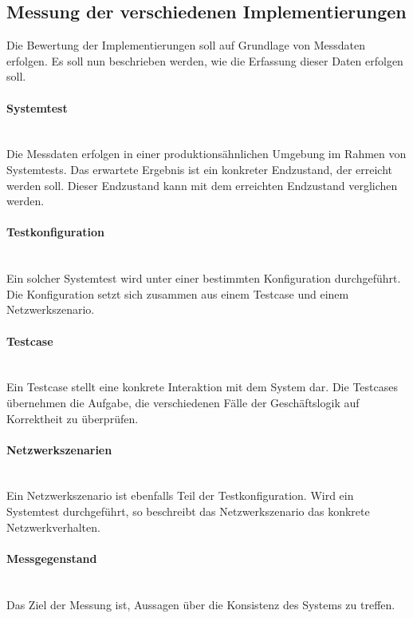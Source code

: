 \subsection{Messung der verschiedenen Implementierungen}

Die Bewertung der Implementierungen soll auf Grundlage von Messdaten erfolgen. Es soll nun beschrieben werden, wie die Erfassung dieser Daten erfolgen soll.


\paragraph*{Systemtest} \mbox{}\\
Die Messdaten erfolgen in einer produktionsähnlichen Umgebung im Rahmen von Systemtests. Das erwartete Ergebnis ist ein konkreter Endzustand, der erreicht werden soll. Dieser Endzustand kann mit dem erreichten Endzustand verglichen werden.

\paragraph*{Testkonfiguration} \mbox{}\\
Ein solcher Systemtest wird unter einer bestimmten Konfiguration durchgeführt. Die Konfiguration setzt sich zusammen aus einem Testcase und einem Netzwerkszenario. 

\paragraph*{Testcase} \mbox{}\\
Ein Testcase stellt eine konkrete Interaktion mit dem System dar. Die Testcases übernehmen die Aufgabe, die verschiedenen Fälle der Geschäftslogik auf Korrektheit zu überprüfen.

\paragraph*{Netzwerkszenarien} \mbox{}\\
Ein Netzwerkszenario ist ebenfalls Teil der Testkonfiguration. Wird ein Systemtest durchgeführt, so beschreibt das Netzwerkszenario das konkrete Netzwerkverhalten.

\paragraph*{Messgegenstand} \mbox{}\\
Das Ziel der Messung ist, Aussagen über die Konsistenz des Systems zu treffen.

